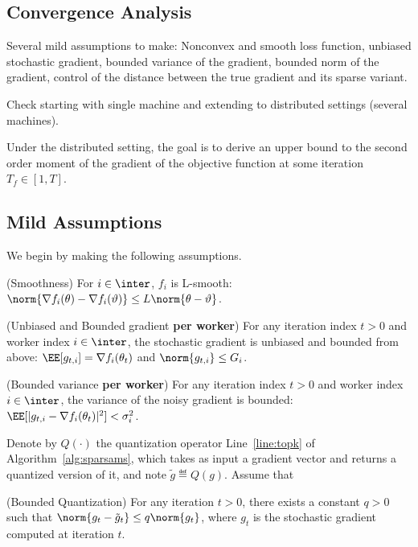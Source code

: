 \documentclass[11pt]{article}
\begin{document}
\subsection{Convergence Analysis}

Several mild assumptions to make: Nonconvex and smooth loss function, unbiased stochastic gradient, bounded variance of the gradient, bounded norm of the gradient, control of the distance between the true gradient and its sparse variant.

Check \citep{chen2020quantized} starting with single machine  and extending to distributed settings (several machines).


Under the distributed setting, the goal is to derive an upper bound to the second order moment of the gradient of the objective function at some iteration $T_f \in [1, T]$.

\subsection{Mild Assumptions}
We begin by making the following assumptions.

\begin{assumption}\label{ass:smooth}(Smoothness)
For $i \in \inter$, $f_i$ is  L-smooth: $\norm{\nabla f_i (\theta) - \nabla f_i (\vartheta)} \leq L \norm{\theta-\vartheta}$.
\end{assumption}

\begin{assumption}\label{ass:boundgrad}(Unbiased and Bounded gradient \textbf{per worker})
For any iteration index $t >0$ and worker index $i \in \inter$, the stochastic gradient is unbiased and bounded from above: $\EE[g_{t,i}] = \nabla f_i(\theta_t)$ and $\norm{g_{t,i}} \leq G_i$.
\end{assumption}

\begin{assumption}\label{ass:quant}(Bounded variance \textbf{per worker})
For any iteration index $t >0$ and worker index $i \in \inter$, the variance of the noisy gradient is bounded: $\EE[|g_{t,i} - \nabla f_i(\theta_t)|^2] < \sigma_i^2$.
\end{assumption}

Denote by $Q(\cdot)$ the quantization operator Line~\ref{line:topk} of Algorithm~\ref{alg:sparsams}, which takes as input a gradient vector and returns a quantized version of it, and note $\tilde{g} \eqdef Q(g)$.
Assume that
\begin{assumption}\label{ass:var}(Bounded Quantization)
For any iteration $t >0$, there exists a constant $q >0$ such that $\norm{g_t - \tilde{g}_t} \leq q \norm{g_t}$, where $g_t$ is the stochastic gradient computed at iteration $t$.
\end{assumption}
\end{document}
